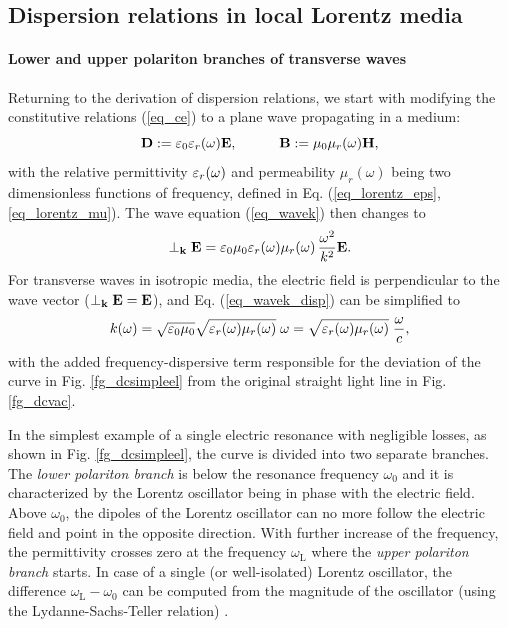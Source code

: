 
\subsection{Dispersion relations in local Lorentz media} \label{disp_rel_local_media}
\paragraph{Lower and upper polariton branches of transverse waves} %
Returning to the derivation of dispersion relations, we start with modifying the constitutive relations (\ref{eq_ce}) to a plane wave propagating in a medium:
\begin{equation}		\mathbf{D} := \varepsilon_0\varepsilon_r(\omega)	\mathbf{E}, \quad\quad\quad						\mathbf{B} := \mu_0\mu_r(\omega)		\mathbf{H},				 \label{eq_ce2}\end{equation}
with the relative permittivity $\varepsilon_r(\omega)$ and permeability $\mu_r(\omega)$ being two dimensionless functions of frequency, defined in Eq. (\ref{eq_lorentz_eps}, \ref{eq_lorentz_mu}). 
The wave equation (\ref{eq_wavek}) then changes to
\begin{equation}  \perp_{\mathbf{k}}\mathbf{E} = \varepsilon_0 \mu_0  \varepsilon_r(\omega) \mu_r(\omega) \, \frac{ \omega^{2}}{k^2} \mathbf{E}.  \label{eq_wavek_disp}\end{equation}
	For transverse waves in isotropic media, the electric field is perpendicular to the wave vector ($\perp_{\mathbf{k}}\mathbf{E} = \mathbf{E}$), and Eq. (\ref{eq_wavek_disp}) can be simplified to  
\begin{equation} k(\omega) = \sqrt{\varepsilon_0 \mu_0} \sqrt{\varepsilon_r(\omega) \mu_{r}(\omega)}\;\omega = \sqrt{\varepsilon_r(\omega) \mu_{r}(\omega)}\; \frac{\omega}{c}, \label{eq_dispeq_loc}\end{equation}
with the added frequency-dispersive term responsible for the deviation of the curve in Fig. \ref{fg_dcsimpleel} from the original straight light line in Fig. \ref{fg_dcvac}. 

In the simplest example of a single electric resonance with negligible losses, as shown in Fig. \ref{fg_dcsimpleel}, the curve is divided into two separate branches. The \textit{lower polariton branch} is below the resonance frequency $\omega_0$ and it is characterized by the Lorentz oscillator being in phase with the electric field. Above $\omega_0$, the dipoles of the Lorentz oscillator can no more follow the electric field and point in the opposite direction. With further increase of the frequency, the permittivity crosses zero at the frequency $\omega_{\text{L}}$ where the \textit{upper polariton branch} starts. In case of a single (or well-isolated) Lorentz oscillator, the difference $\omega_{\text{L}} - \omega_0$ can be computed from the magnitude of the oscillator (using the Lydanne-Sachs-Teller relation) \cite{klingshirn2007semiconductor}.

